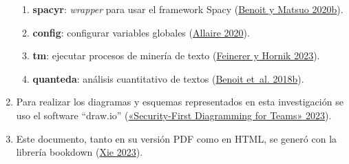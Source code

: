 \documentclass[
  12pt,
  openany]{book}
\begin{document}
\begin{enumerate}
\begin{enumerate}
  \item
    \textbf{spacyr}: \emph{wrapper} para usar el framework Spacy (\protect\hyperlink{ref-spacyr-2}{Benoit y Matsuo 2020b}).
  \item
    \textbf{config}: configurar variables globales (\protect\hyperlink{ref-config}{Allaire 2020}).
  \item
    \textbf{tm}: ejecutar procesos de minería de texto (\protect\hyperlink{ref-tm}{Feinerer y Hornik 2023}).
  \item
    \textbf{quanteda}: análisis cuantitativo de textos (\protect\hyperlink{ref-quanteda-2}{Benoit et~al. 2018b}).
  \end{enumerate}
\item
  Para realizar los diagramas y esquemas representados en esta investigación se uso el software ``draw.io'' (\protect\hyperlink{ref-draw2023}{{«Security-First Diagramming for Teams»} 2023}).
\item
  Este documento, tanto en su versión PDF como en HTML, se generó con la librería bookdown (\protect\hyperlink{ref-bookdown}{Xie 2023}).
\end{enumerate}
\end{document}
